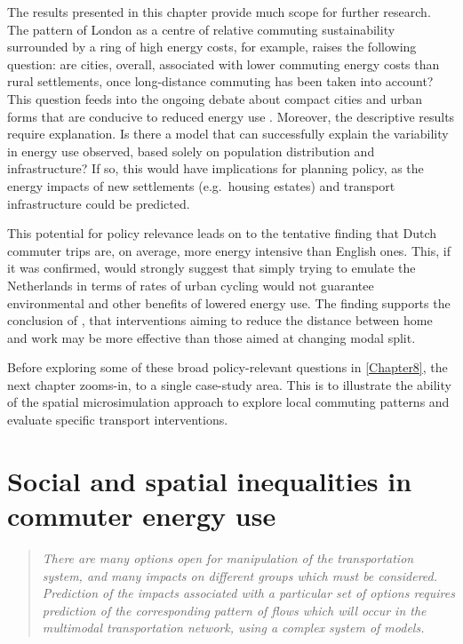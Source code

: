 \documentclass[a4paper, 11pt, twoside]{Thesis}
\begin{document}
The results presented in this chapter provide much scope for further research.
The pattern of London as a centre of relative commuting sustainability surrounded by
a ring of high energy costs, for example, raises the following question:
are cities, overall, associated
with lower commuting energy costs than rural settlements, once long-distance
commuting has been taken into account? This question feeds into the ongoing
debate about compact cities and urban forms that are conducive to reduced energy
use \citep{Levinson2012}. Moreover, the descriptive results require explanation.
Is there a model that can successfully explain the variability in energy
use observed, based solely on population distribution and infrastructure?
If so, this would have implications for planning policy, as the energy impacts
of new settlements (e.g.~housing estates) and transport infrastructure could
be predicted.

This potential for policy relevance leads on to the tentative
finding that Dutch commuter trips are, on average, more energy intensive than
English ones. This, if it was confirmed, would strongly suggest that simply
trying to emulate the Netherlands in terms of rates of urban cycling
would not guarantee environmental and other benefits of lowered energy use.
The finding supports the conclusion of \citet{Boussauw2009}, that
interventions aiming to reduce the distance between
home and work may be more effective than those aimed at changing
modal split.

Before exploring some of these broad policy-relevant questions 
in \cref{Chapter8}, the next chapter zooms-in, to a single case-study area.
This is to illustrate the ability of the spatial microsimulation approach to
explore local commuting patterns and evaluate specific transport interventions.

 

\chapter{Social and spatial inequalities in commuter energy use} 
\label{Chapter7}
\fancyhead[RE,LO]{\thepage}
\begin{quotation}
\textit{ There  are many options open  for manipulation of the transportation
system,
and many  impacts on different groups which must
be considered. Prediction of the impacts associated with
a particular set of options requires prediction of the corresponding
pattern of flows which will occur in the multimodal transportation
network, using a complex system of models.}
\end{quotation} {\flushright \citep{manheim1968search}}
\end{document}

